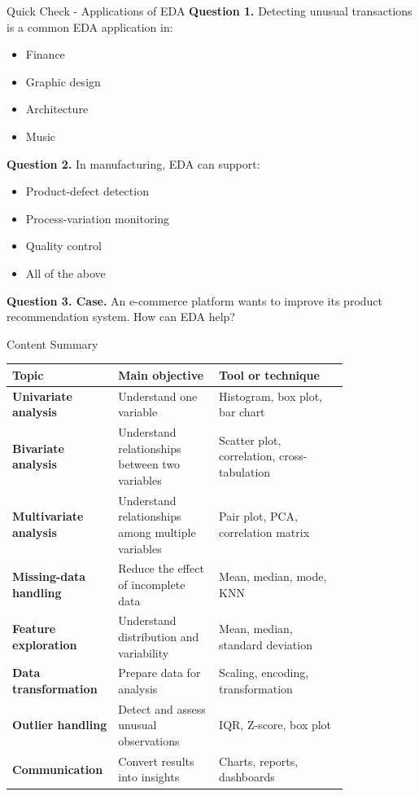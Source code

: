 \documentclass[aspectratio=169,11pt]{beamer}
\begin{document}
\begin{frame}[allowframebreaks]{Quick Check - Applications of EDA}
\footnotesize
\textbf{Question 1.} Detecting unusual transactions is a common EDA application in:\par\medskip
\begin{itemize}
\item[\textbf{A.}] Finance
\item[\textbf{B.}] Graphic design
\item[\textbf{C.}] Architecture
\item[\textbf{D.}] Music
\end{itemize}
\textbf{Question 2.} In manufacturing, EDA can support:\par\medskip
\begin{itemize}
\item[\textbf{A.}] Product-defect detection
\item[\textbf{B.}] Process-variation monitoring
\item[\textbf{C.}] Quality control
\item[\textbf{D.}] All of the above
\end{itemize}
\textbf{Question 3. Case.} An e-commerce platform wants to improve its product recommendation system. How can EDA help?\par\medskip
\end{frame}
\begin{frame}[allowframebreaks]{Content Summary}
\footnotesize
\begin{center}\scriptsize
\begin{tabular}{@{}p{0.18\linewidth}p{0.28\linewidth}p{0.36\linewidth}@{}}
\toprule
\textbf{Topic} & \textbf{Main objective} & \textbf{Tool or technique}\\
\midrule
\textbf{Univariate analysis} & Understand one variable & Histogram, box plot, bar chart\\
\textbf{Bivariate analysis} & Understand relationships between two variables & Scatter plot, correlation, cross-tabulation\\
\textbf{Multivariate analysis} & Understand relationships among multiple variables & Pair plot, PCA, correlation matrix\\
\textbf{Missing-data handling} & Reduce the effect of incomplete data & Mean, median, mode, KNN\\
\textbf{Feature exploration} & Understand distribution and variability & Mean, median, standard deviation\\
\textbf{Data transformation} & Prepare data for analysis & Scaling, encoding, transformation\\
\textbf{Outlier handling} & Detect and assess unusual observations & IQR, Z-score, box plot\\
\textbf{Communication} & Convert results into insights & Charts, reports, dashboards\\
\bottomrule
\end{tabular}
\end{center}
\end{frame}
\end{document}
